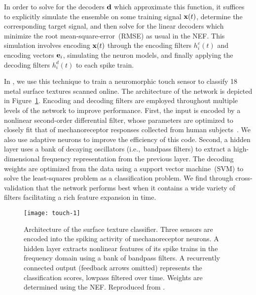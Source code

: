 
In order to solve for the decoders $\mathbf{d}$ which approximate this function, it suffices to explicitly simulate the ensemble on some training signal $\mathbf{x}(t)$, determine the corresponding target signal, and then solve for the linear decoders which minimize the root mean-square-error~(RMSE) as usual in the NEF.
This simulation involves encoding $\mathbf{x}(t)$ through the encoding filters $h_i^e(t)$ and encoding vectors $\mathbf{e}_i$, simulating the neuron models, and finally applying the decoding filters $h_i^d(t)$ to each spike train.

In \citet{voelker2016a}, we use this technique to train a neuromorphic touch sensor to classify 18 metal surface textures scanned online.
The architecture of the network is depicted in Figure~\ref{fig:touch-network}.
Encoding and decoding filters are employed throughout multiple levels of the network to improve performance.
First, the input is encoded by a nonlinear second-order differential filter, whose parameters are optimized to closely fit that of mechanoreceptor responses collected from human subjects~\citep{kim2010predicting}.
We also use adaptive neurons to improve the efficiency of this code.
Second, a hidden layer uses a bank of decaying oscillators (i.e.,~bandpass filters) to extract a high-dimensional frequency representation from the previous layer.
The decoding weights are optimized from the data using a support vector machine~(SVM) to solve the least-squares problem as a classification problem.
We find through cross-validation that the network performs best when it contains a wide variety of filters facilitating a rich feature expansion in time.

\begin{figure}
    \centering
    \texttt{[image: touch-1]}
     
    \caption{\label{fig:touch-network} Architecture of the surface texture classifier.
    Three sensors are encoded into the spiking activity of mechanoreceptor neurons.
    A hidden layer extracts nonlinear features of its spike trains in the frequency domain using a bank of bandpass filters.
    A recurrently connected output (feedback arrows omitted) represents the classification scores, lowpass filtered over time.
    Weights are determined using the NEF.
    Reproduced from \citet[][Figure~1]{voelker2016a}.
}
\end{figure}

